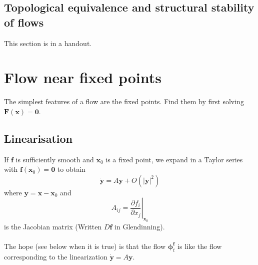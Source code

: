 \documentclass{article}
\newcommand{\bp}{\bm{\phi}}   %
\begin{document}
\subsection{Topological equivalence and structural stability of flows}
This section is in a handout.
\\
\section{Flow near fixed points}
The simplest features of a flow are the fixed points. Find them by first 
solving $\bm{F}(\bm{x}) = \bm{0}$.
\\
\subsection{Linearisation}
If $\bm{f}$ is sufficiently smooth and $\bm{x}_0$ is a fixed point, we expand
in a Taylor series with $\bm{f}(\bm{x}_0)=\bm{0}$ to obtain 
\[\dot{\bm{y}} = A\bm{y} + O(|\bm{y}|^2)\]
 where $\bm{y} = \bm{x} - \bm{x}_0$ and
\[ A_{ij} = \left. \frac{\partial f_i}{\partial x_j}\right| _{\bm{x}_0}\]
is the Jacobian matrix (Written $D\bm{f}$ in Glendinning).
\\
\\
The hope (see below when it is true) is that the flow $\bp_t^{\bm{f}}$ is
like the flow corresponding to the linearization $\dot{\bm{y}} = A \bm{y}$.
\\
\end{document}
